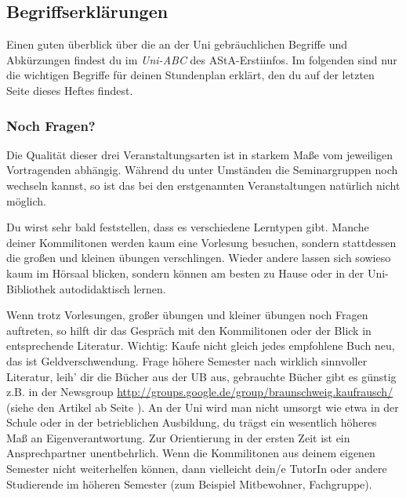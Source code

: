 \subsection{Begriffserklärungen}



Einen guten überblick über die an der Uni gebräuchlichen Begriffe und
Abkürzungen findest du im \emph{Uni-ABC} des AStA-Erstiinfos. Im folgenden
sind nur die wichtigen Begriffe für deinen Stundenplan erklärt, den du
auf der letzten Seite dieses Heftes findest.




\subsubsection*{Noch Fragen?}

Die Qualität dieser drei Veranstaltungsarten ist in starkem Maße vom
jeweiligen Vortragenden abhängig. Während du unter Umständen die
Seminargruppen noch wechseln kannst, so ist das bei den erstgenannten
Veranstaltungen natürlich nicht möglich.

Du wirst sehr bald feststellen, dass es verschiedene Lerntypen gibt. Manche
deiner Kommilitonen werden kaum eine Vorlesung besuchen, sondern stattdessen die großen
und kleinen übungen verschlingen. Wieder andere lassen sich sowieso kaum im
Hörsaal blicken, sondern können am besten zu Hause oder in der Uni-Bibliothek
autodidaktisch lernen.

Wenn trotz Vorlesungen, großer übungen und kleiner übungen noch Fragen
auftreten, so hilft dir das Gespräch mit den Kommilitonen oder der Blick in
entsprechende Literatur.
Wichtig: Kaufe nicht gleich jedes empfohlene Buch neu,
das ist Geldverschwendung. Frage höhere Semester nach wirklich sinnvoller
Literatur, leih' dir die Bücher aus der UB aus, gebrauchte Bücher gibt es
günstig z.B. in der Newsgroup \url{http://groups.google.de/group/braunschweig.kaufrausch/} (siehe den Artikel
ab Seite \pageref{elekinf}). An der Uni wird man nicht umsorgt wie etwa in der
Schule oder in der betrieblichen Ausbildung, du trägst ein wesentlich höheres
Maß an Eigenverantwortung. Zur Orientierung in der ersten Zeit ist ein
Ansprechpartner unentbehrlich. Wenn die Kommilitonen aus
deinem eigenen Semester nicht weiterhelfen können, dann vielleicht dein/e TutorIn oder andere
Studierende im höheren Semester (zum Beispiel Mitbewohner, Fachgruppe).

